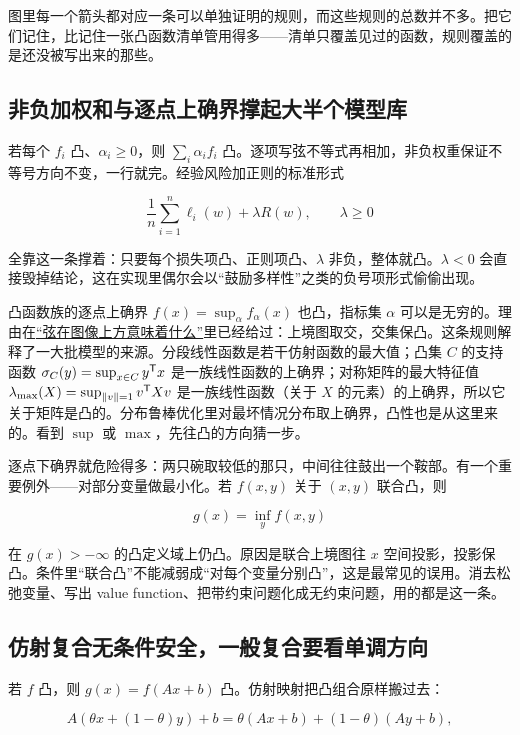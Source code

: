 图里每一个箭头都对应一条可以单独证明的规则，而这些规则的总数并不多。把它们记住，比记住一张凸函数清单管用得多——清单只覆盖见过的函数，规则覆盖的是还没被写出来的那些。

\subsection{非负加权和与逐点上确界撑起大半个模型库}

若每个 \(f_i\) 凸、\(\alpha_i\ge0\)，则 \(\sum_i\alpha_if_i\) 凸。逐项写弦不等式再相加，非负权重保证不等号方向不变，一行就完。经验风险加正则的标准形式

\[
\frac1n\sum_{i=1}^n\ell_i(w)+\lambda R(w),\qquad\lambda\ge0
\]

全靠这一条撑着：只要每个损失项凸、正则项凸、\(\lambda\) 非负，整体就凸。\(\lambda<0\) 会直接毁掉结论，这在实现里偶尔会以``鼓励多样性''之类的负号项形式偷偷出现。

凸函数族的逐点上确界 \(f(x)=\sup_\alpha f_\alpha(x)\) 也凸，指标集 \(\alpha\) 可以是无穷的。理由在\hyperref[sec:09-Convex-Optimization/03-Convex-Functions/01]{``弦在图像上方意味着什么''}里已经给过：上境图取交，交集保凸。这条规则解释了一大批模型的来源。分段线性函数是若干仿射函数的最大值；凸集 \(C\) 的支持函数 \(\sigma_C(y)=\sup_{x\in C}y^{\mathsf{T}}x\) 是一族线性函数的上确界；对称矩阵的最大特征值 \(\lambda_{\max}(X)=\sup_{\left\lVert v\right\rVert=1}v^{\mathsf{T}}Xv\) 是一族线性函数（关于 \(X\) 的元素）的上确界，所以它关于矩阵是凸的。分布鲁棒优化里对最坏情况分布取上确界，凸性也是从这里来的。看到 \(\sup\) 或 \(\max\)，先往凸的方向猜一步。

逐点下确界就危险得多：两只碗取较低的那只，中间往往鼓出一个鞍部。有一个重要例外——对部分变量做最小化。若 \(f(x,y)\) 关于 \((x,y)\) 联合凸，则

\[
g(x)=\inf_y f(x,y)
\]

在 \(g(x)>-\infty\) 的凸定义域上仍凸。原因是联合上境图往 \(x\) 空间投影，投影保凸。条件里``联合凸''不能减弱成``对每个变量分别凸''，这是最常见的误用。消去松弛变量、写出 value function、把带约束问题化成无约束问题，用的都是这一条。

\subsection{仿射复合无条件安全，一般复合要看单调方向}

若 \(f\) 凸，则 \(g(x)=f(Ax+b)\) 凸。仿射映射把凸组合原样搬过去：

\[
A(\theta x+(1-\theta)y)+b=\theta(Ax+b)+(1-\theta)(Ay+b),
\]

